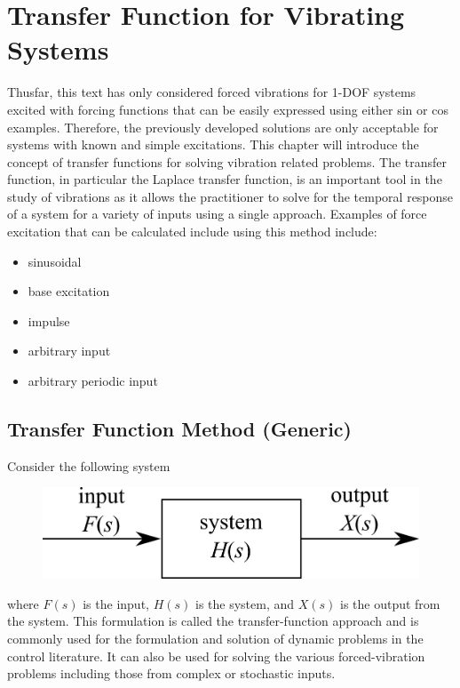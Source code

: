 \documentclass[12pt,letter]{article}
\numberwithin{ex}{section} %
\numberwithin{re}{section} %
\begin{document}
	\large{}
	
	\setcounter{section}{3}
	\section{Transfer Function for Vibrating Systems}

		Thusfar, this text has only considered forced vibrations for 1-DOF systems excited with forcing functions that can be easily expressed using either sin or cos examples. Therefore, the previously developed solutions are only acceptable for systems with known and simple excitations. This chapter will introduce the concept of transfer functions for solving vibration related problems. The transfer function, in particular the Laplace transfer function, is an important tool in the study of vibrations as it allows the practitioner to solve for the temporal response of a system for a variety of inputs using a single approach. Examples of force excitation that can be calculated include using this method include:
		\begin{itemize}
			\item sinusoidal
			\item base excitation
			\item impulse
			\item arbitrary input
			\item arbitrary periodic input
		\end{itemize}

		\subsection{Transfer Function Method (Generic)}

			Consider the following system
			\begin{figure}[H]
				\centering
				\includegraphics[]{../Figures/transfer_function_system.png}
			\end{figure}
			\noindent where $F(s)$ is the input, $H(s)$ is the system, and $X(s)$ is the output from the system. This formulation is called the transfer-function approach and is commonly used for the formulation and solution of dynamic problems in the control literature. It can also be used for solving the various forced-vibration problems including those from complex or stochastic inputs. 
\end{document}
